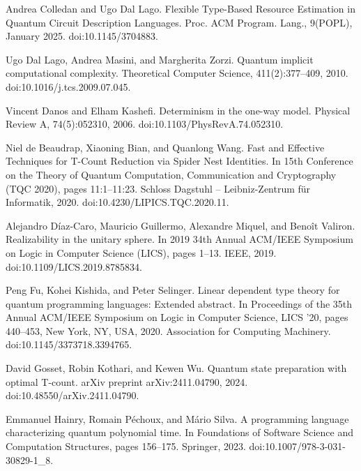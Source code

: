 \par\noindent  [10]  Andrea Colledan and Ugo Dal Lago.  Flexible Type-Based Resource Estimation in Quantum Circuit Description Languages.  Proc. ACM Program. Lang., 9(POPL), January 2025.  doi:10.1145/3704883.  
 
\par\noindent  [11]  Ugo Dal Lago, Andrea Masini, and Margherita Zorzi.  Quantum implicit computational complexity.  Theoretical Computer Science, 411(2):377–409, 2010.  doi:10.1016/j.tcs.2009.07.045.  
 
\par\noindent  [12]  Vincent Danos and Elham Kashefi.  Determinism in the one-way model.  Physical Review A, 74(5):052310, 2006.  doi:10.1103/PhysRevA.74.052310.  
 
\par\noindent  [13]  Niel de Beaudrap, Xiaoning Bian, and Quanlong Wang.  Fast and Effective Techniques for T-Count Reduction via Spider Nest Identities.  In 15th Conference on the Theory of Quantum Computation, Communication and Cryptography (TQC 2020), pages 11:1–11:23. Schloss Dagstuhl – Leibniz-Zentrum für Informatik, 2020.  doi:10.4230/LIPICS.TQC.2020.11.  
 
\par\noindent  [14]  Alejandro Díaz-Caro, Mauricio Guillermo, Alexandre Miquel, and Benoît Valiron.  Realizability in the unitary sphere.  In 2019 34th Annual ACM/IEEE Symposium on Logic in Computer Science (LICS), pages 1–13. IEEE, 2019.  doi:10.1109/LICS.2019.8785834.  
 
\par\noindent  [15]  Peng Fu, Kohei Kishida, and Peter Selinger.  Linear dependent type theory for quantum programming languages: Extended abstract.  In Proceedings of the 35th Annual ACM/IEEE Symposium on Logic in Computer Science, LICS ’20, pages 440–453, New York, NY, USA, 2020. Association for Computing Machinery.  doi:10.1145/3373718.3394765.  
 
\par\noindent  [16]  David Gosset, Robin Kothari, and Kewen Wu.  Quantum state preparation with optimal T-count.  arXiv preprint arXiv:2411.04790, 2024.  doi:10.48550/arXiv.2411.04790.  
 
\par\noindent  [17]  Emmanuel Hainry, Romain Péchoux, and Mário Silva.  A programming language characterizing quantum polynomial time.  In Foundations of Software Science and Computation Structures, pages 156–175. Springer, 2023.  doi:10.1007/978-3-031-30829-1\_8.  
 
